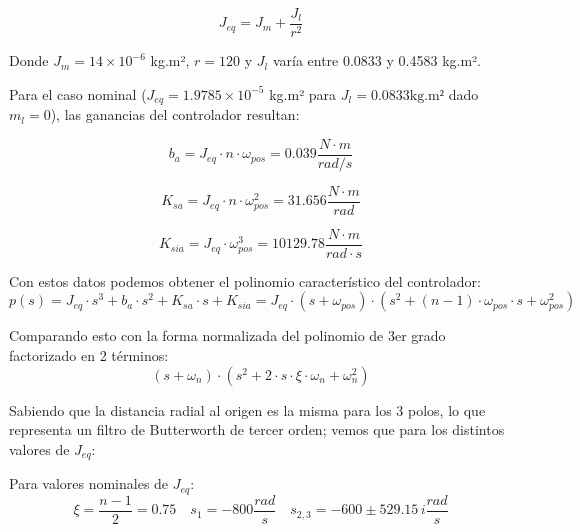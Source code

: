 \documentclass{article}
\begin{document}
\begin{equation}
J_{eq} = J_m + \frac{J_l}{r^2}
\label{eq:inercia_equivalente}
\end{equation}

Donde $J_m = 14\times10^{-6}$ kg.m², $r = 120$ y $J_l$ varía entre 0.0833 y 0.4583 kg.m².

Para el caso nominal ($J_{eq} = 1{.}9785\times10^{-5}$ kg.m² para \(J_l = 0.0833 \text{kg.m²}\) dado \(m_l = 0\)), las ganancias del controlador resultan:

\begin{equation}
b_a = J_{eq} \cdot n \cdot \omega_{pos} = 0.039 \frac{N\cdot m}{rad/s}
\label{eq:ganancia_ba}
\end{equation}

\begin{equation}
K_{sa} = J_{eq} \cdot n \cdot \omega_{pos}^2 = 31.656 \frac{N\cdot m}{rad}
\label{eq:ganancia_ksa}
\end{equation}

\begin{equation}
K_{sia} = J_{eq} \cdot \omega_{pos}^3 = 10129.78 \frac{N\cdot m}{rad\cdot s}
\label{eq:ganancia_ksia}
\end{equation}

Con estos datos podemos obtener el polinomio característico del controlador:
\begin{equation}
p(s) = J_{eq} \cdot s^3 + b_a \cdot s^2 + K_{sa} \cdot s + K_{sia} = J_{eq} \cdot (s + \omega_{pos}) \cdot (s^2 + (n-1) \cdot \omega_{pos} \cdot s + \omega_{pos}^2)
\label{eq:polinomio_caracteristico}
\end{equation}

Comparando esto con la forma normalizada del polinomio de 3er grado factorizado en 2 términos:
\begin{equation}
(s + \omega_n) \cdot (s^2 + 2 \cdot s \cdot \xi \cdot \omega_n + \omega_n^2)
\label{eq:forma_normalizada}
\end{equation}

Sabiendo que la distancia radial al origen es la misma para los 3 polos, lo que representa un filtro de Butterworth de tercer 
orden; vemos que para los distintos valores de $J_{eq}$:

Para valores nominales de $J_{eq}$:
\begin{equation}
\xi = \frac{n-1}{2} = 0.75 \quad s_1 = -800\frac{rad}{s} \quad s_{2,3} = -600 \pm 529.15\,i \frac{rad}{s}
\label{eq:polos_nominal}
\end{equation}
\end{document}
